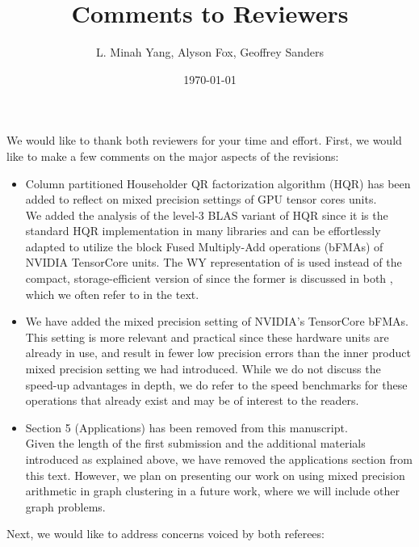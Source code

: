 \documentclass[10pt]{article}
\title{Comments to Reviewers}
\author{\small L. Minah Yang, Alyson Fox, Geoffrey Sanders \vspace{-5cm}}
\date{\small \today}
\begin{document}
\maketitle
We would like to thank both reviewers for your time and effort. 
First, we would like to make a few comments on the major aspects of the revisions:
\begin{itemize}\bfseries
	\item Column partitioned Householder QR factorization algorithm (HQR) has been added to reflect on mixed precision settings of GPU tensor cores units.\\
	{\normalfont We added the analysis of the level-3 BLAS variant of HQR since it is the standard HQR implementation in many libraries and can be effortlessly adapted to utilize the block Fused Multiply-Add operations (bFMAs) of NVIDIA TensorCore units.
	The WY representation of \cite{Bischof1987} is used instead of the compact, storage-efficient version of \cite{Schreiber1989} since the former is discussed in both \cite{golub2013matrix,Higham2002}, which we often refer to in the text.
	}
	\item We have added the mixed precision setting of NVIDIA's TensorCore bFMAs.
	{\normalfont
	This setting is more relevant and practical since these hardware units are already in use, and result in fewer low precision errors than the inner product mixed precision setting we had introduced. 
	While we do not discuss the speed-up advantages in depth, we do refer to the speed benchmarks for these operations that already exist and may be of interest to the readers.
	}
	\item Section 5 (Applications) has been removed from this manuscript.\\
	{\normalfont 
	Given the length of the first submission and the additional materials introduced as explained above, we have removed the applications section from this text.
	However, we plan on presenting our work on using mixed precision arithmetic in graph clustering in a future work, where we will include other graph problems.
	} 
	
\end{itemize}
Next, we would like to address concerns voiced by both referees:
\end{document}

